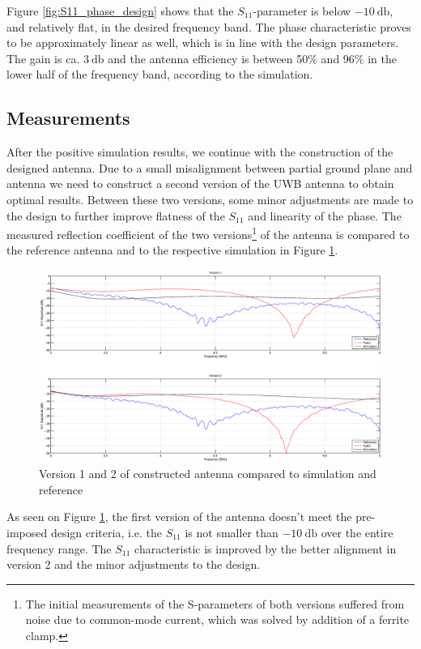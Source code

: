 \documentclass[a4paper]{article}        %
\begin{document}
		Figure \ref{fig:S11_phase_design} shows that the $S_{11}$-parameter is below $\SI{-10}{\decibel}$, and relatively flat, in the desired frequency band. The phase characteristic proves to be approximately linear as well, which is in line with the design parameters. The gain is ca. $\SI{3}{\decibel}$ and the antenna efficiency is between 50\% and 96\% in the lower half of the frequency band, according to the simulation. 

	\subsection{Measurements}
		After the positive simulation results, we continue with the construction of the designed antenna. Due to a small misalignment between partial ground plane and antenna we need to construct a second version of the UWB antenna to obtain optimal results. Between these two versions, some minor adjustments are made to the design to further improve flatness of the $S_{11}$ and linearity of the phase. The measured reflection coefficient of the two versions\footnote{The initial measurements of the S-parameters of both versions suffered from noise due to common-mode current, which was solved by addition of a ferrite clamp.} of the antenna is compared to the reference antenna and to the respective simulation in Figure \ref{fig:antenna_comp}. 

		\begin{figure}[H]
			\centering
			\includegraphics[width=\textwidth]{images/antenna/antenna_comparison}
			\caption{Version 1 and 2 of constructed antenna compared to simulation and reference}
			\label{fig:antenna_comp}
		\end{figure}

		As seen on Figure \ref{fig:antenna_comp}, the first version of the antenna doesn't meet the pre-imposed design criteria, i.e. the $S_{11}$ is not smaller than $\SI{-10}{\decibel}$ over the entire frequency range.
		The $S_{11}$ characteristic is improved by the better alignment in version 2 and the minor adjustments to the design.
\end{document}
